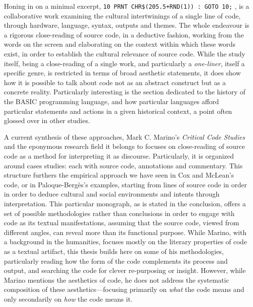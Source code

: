 Honing in on a minimal excerpt, \lstinline{10 PRNT CHR$(205.5+RND(1)) : GOTO 10;} \citep{montfort_10_2014}, is a collaborative work examining the cultural intertwinings of a single line of code, through hardware, language, syntax, outputs and themes. The whole endeavour is a rigorous close-reading of source code, in a deductive fashion, working from the words on the screen and elaborating on the context within which these words exist, in order to establish the cultural relevance of source code. While the study itself, being a close-reading of a single work, and particularly a \emph{one-liner}, itself a specific genre, is restricted in terms of broad aesthetic statements, it does show how it is possible to talk about code not as an abstract construct but as a concrete reality. Particularly interesting is the section dedicated to the history of the BASIC programming language, and how particular languages afford particular statements and actions in a given historical context, a point often glossed over in other studies.

A current synthesis of these approaches, Mark C. Marino's \emph{Critical Code Studies} \citep{marino_critical_2020} and the eponymous research field it belongs to focuses on close-reading of source code as a method for interpreting it as discourse. Particularly, it is organized around cases studies: each with source code, annotations and commentary. This structure furthers the empirical approach we have seen in Cox and McLean's code, or in Paloque-Bergès's examples, starting from lines of source code in order in order to deduce cultural and social environments and intents through interpretation. This particular monograph, as is stated in the conclusion, offers a set of possible methodologies rather than conclusions in order to engage with code as its textual manifestations, assuming that the source code, viewed from different angles, can reveal more than its functional purpose. While Marino, with a background in the humanities, focuses mostly on the literary properties of code as a textual artifact, this thesis builds here on some of his methodologies, particularly reading how the form of the code complements its process and output, and searching the code for clever re-purposing or insight. However, while Marino mentions the aesthetics of code, he does not address the systematic composition of these aesthetics—focusing primarily on \emph{what} the code means and only secondarily on \emph{how} the code means it.

